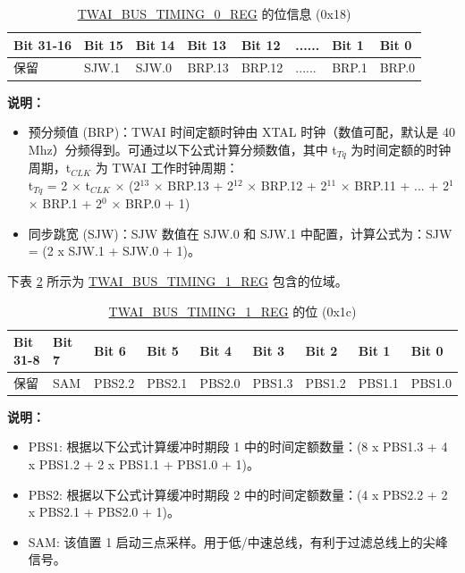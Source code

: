 \documentclass[main\_\_CN.tex]{subfiles}
\begin{document}
\begin{longtable}[c]{|p{2cm}|p{1.5cm}|p{1.5cm}|p{1.5cm}|p{1.5cm}|p{1.5cm}|p{1.5cm}|p{1.5cm}|}
\caption{\hyperref[regdesc:TWAIBUSTIMING0REG]{TWAI\_BUS\_TIMING\_0\_REG} 的位信息 (0x18)}
\label{tab:twai-bit-info-bus-timing-0-reg}\\\hline
\rowcolor{lightgray}
  \textbf{Bit 31-16} & \textbf{Bit 15} & \textbf{Bit 14} & \textbf{Bit 13} & \textbf{Bit 12} & \textbf{......} & \textbf{Bit 1} & \textbf{Bit 0}\\\hline 
  保留& SJW.1 & SJW.0 & BRP.13 & BRP.12 & ...... & BRP.1 & BRP.0\\\hline
\end{longtable}
\vspace{-1.5em}
{\bfseries 说明：}\\
\begin{itemize}
    \item 预分频值 (BRP)：TWAI 时间定额时钟由 XTAL 时钟（数值可配，默认是 40 Mhz）分频得到。可通过以下公式计算分频数值，其中 t$_{Tq}$ 为时间定额的时钟周期，t$_{CLK}$ 为 TWAI 工作时钟周期：\\

t$_{Tq}$ = 2 × t$_{CLK}$ × (2$^{13}$ × BRP.13 + 2$^{12}$ × BRP.12 + 2$^{11}$ × BRP.11 + ... + 2$^1$ × BRP.1 + 2$^0$ × BRP.0 + 1)
    \item 同步跳宽 (SJW)：SJW 数值在 SJW.0 和 SJW.1 中配置，计算公式为：SJW = (2 x SJW.1 + SJW.0 + 1)。
\end{itemize}

下表 \ref{tab:twai-bit-info-bus-timing-1-reg} 所示为 \hyperref[regdesc:TWAIBUSTIMING1REG]{TWAI\_BUS\_TIMING\_1\_REG} 包含的位域。

\begin{longtable}[c]{|p{1.4cm}|p{1.4cm}|p{1.4cm}|p{1.4cm}|p{1.4cm}|p{1.4cm}|p{1.4cm}|p{1.4cm}|p{1.4cm}|}
    \caption{\hyperref[regdesc:TWAIBUSTIMING1REG]{TWAI\_BUS\_TIMING\_1\_REG} 的位 (0x1c)}
    \label{tab:twai-bit-info-bus-timing-1-reg}\\
    \hline
       \rowcolor{lightgray}
   \textbf{Bit 31-8} & \textbf{Bit 7} & \textbf{Bit 6} & \textbf{Bit 5} & \textbf{Bit 4} & \textbf{Bit 3} & \textbf{Bit 2} & \textbf{Bit 1} & \textbf{Bit 0}\\\hline 
   保留 & SAM & PBS2.2 & PBS2.1 & PBS2.0 & PBS1.3 &PBS1.2 & PBS1.1 & PBS1.0\\
    \hline
\end{longtable}
\vspace{-1.5em}
{\bfseries 说明：}\\
\begin{itemize}
    \item PBS1: 根据以下公式计算缓冲时期段 1 中的时间定额数量：(8 x PBS1.3 + 4 x PBS1.2 + 2 x PBS1.1 + PBS1.0 + 1)。
    \item PBS2: 根据以下公式计算缓冲时期段 2 中的时间定额数量：(4 x PBS2.2 + 2 x PBS2.1 + PBS2.0 + 1)。
    \item SAM: 该值置 1 启动三点采样。用于低/中速总线，有利于过滤总线上的尖峰信号。
\end{itemize}
\end{document}
